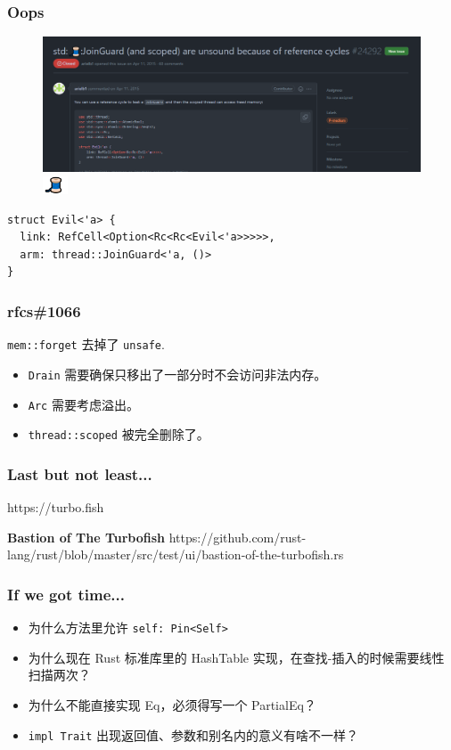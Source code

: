 \documentclass[UTF-8]{ctexbeamer}
\begin{document}
\begin{frame}[fragile]
  \frametitle{Oops}

  \begin{figure}
    \includegraphics[width=\textwidth]{assets/thread.png}
    \caption{\includegraphics[width=2em]{assets/thread-small.png}}
  \end{figure}

  \begin{verbatim}
struct Evil<'a> {
  link: RefCell<Option<Rc<Rc<Evil<'a>>>>>,
  arm: thread::JoinGuard<'a, ()>
}
  \end{verbatim}
\end{frame}

\begin{frame}
  \frametitle{rfcs\#1066}
  \texttt{mem::forget} 去掉了 \texttt{unsafe}.

  \pause

  \begin{itemize}
    \item \texttt{Drain} 需要确保只移出了一部分时不会访问非法内存。
    \item \texttt{Arc} 需要考虑溢出。
    \item \texttt{thread::scoped} 被完全删除了。
  \end{itemize}
\end{frame}

\begin{frame}
  \frametitle{Last but not least...}

  https://turbo.fish

  \pause

  \textbf{Bastion of The Turbofish}
  https://github.com/rust-lang/rust/blob/master/src/test/ui/bastion-of-the-turbofish.rs
\end{frame}

\begin{frame}
  \frametitle{If we got time...}

  \begin{itemize}
    \item 为什么方法里允许 \texttt{self: Pin<Self>}
    \item 为什么现在 Rust 标准库里的 HashTable 实现，在查找-插入的时候需要线性扫描两次？
    \item 为什么不能直接实现 Eq，必须得写一个 PartialEq？
    \item \texttt{impl Trait} 出现返回值、参数和别名内的意义有啥不一样？
  \end{itemize}
\end{frame}
\end{document}

